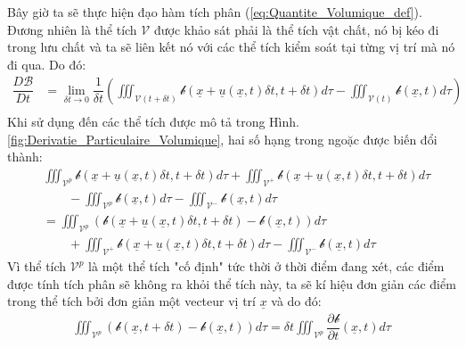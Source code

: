 \documentclass[../../../main.tex]{subfiles}
\begin{document}
		Bây giờ ta sẽ thực hiện đạo hàm tích phân (\ref{eq:Quantite_Volumique_def}). Đương nhiên là thể tích $\mathscr{V}$ được khảo sát phải là thể tích vật chất, nó bị kéo đi trong lưu chất và ta sẽ liên kết nó với các thể tích kiểm soát tại từng vị trí mà nó đi qua. Do đó:
			\[
				\begin{aligned}
					\dfrac{D\mathscr{B}}{Dt}&=\lim\limits_{\delta t\rightarrow0}\dfrac{1}{\delta t}\left(\iiint_{\mathscr{V}\left(t+\delta t\right)}\mathcal{b}\left(\underline{x}+\underline{u}\left(\underline{x},t\right)\delta t,t+\delta t\right)d\tau-\iiint_{\mathscr{V}\left(t\right)}\mathcal{b}\left(\underline{x},t\right)d\tau\right)\\
				\end{aligned}
			\]
		Khi sử dụng đến các thể tích được mô tả trong Hình. \ref{fig:Derivatie_Particulaire_Volumique}, hai số hạng trong ngoặc được biến đổi thành:
			\[
				\begin{aligned}
					&\iiint_{\mathscr{V}^p}\mathcal{b}\left(\underline{x}+\underline{u}\left(\underline{x},t\right)\delta t,t+\delta t\right)d\tau+\iiint_{\mathscr{V}^+}\mathcal{b}\left(\underline{x}+\underline{u}\left(\underline{x},t\right)\delta t,t+\delta t\right)d\tau\\
					&\qquad-\iiint_{\mathscr{V}^p}\mathcal{b}\left(\underline{x},t\right)d\tau-\iiint_{\mathscr{V}^-}\mathcal{b}\left(\underline{x},t\right)d\tau\\
					&=\iiint_{\mathscr{V}^p}\left(\mathcal{b}\left(\underline{x}+\underline{u}\left(\underline{x},t\right)\delta t,t+\delta t\right)-\mathcal{b}\left(\underline{x},t\right)\right)d\tau\\
					&\qquad+\iiint_{\mathscr{V}^+}\mathcal{b}\left(\underline{x}+\underline{u}\left(\underline{x},t\right)\delta t,t+\delta t\right)d\tau-\iiint_{\mathscr{V}^-}\mathcal{b}\left(\underline{x},t\right)d\tau
				\end{aligned}
			\]
		Vì thể tích $\mathscr{V}^p$ là một thể tích "cố định" tức thời ở thời điểm đang xét, các điểm được tính tích phân sẽ không ra khỏi thể tích này, ta sẽ kí hiệu đơn giản các điểm trong thể tích bởi đơn giản một vecteur vị trí $\underline{x}$ và do đó:
			\[
				\begin{aligned}
					\iiint_{\mathscr{V}^p}\left(\mathcal{b}\left(\underline{x},t+\delta t\right)-\mathcal{b}\left(\underline{x},t\right)\right)d\tau=\delta t\iiint_{\mathscr{V}^p}\dfrac{\partial\mathcal{b}}{\partial t}\left(\underline{x},t\right)d\tau\\
				\end{aligned}
			\]
\end{document}

